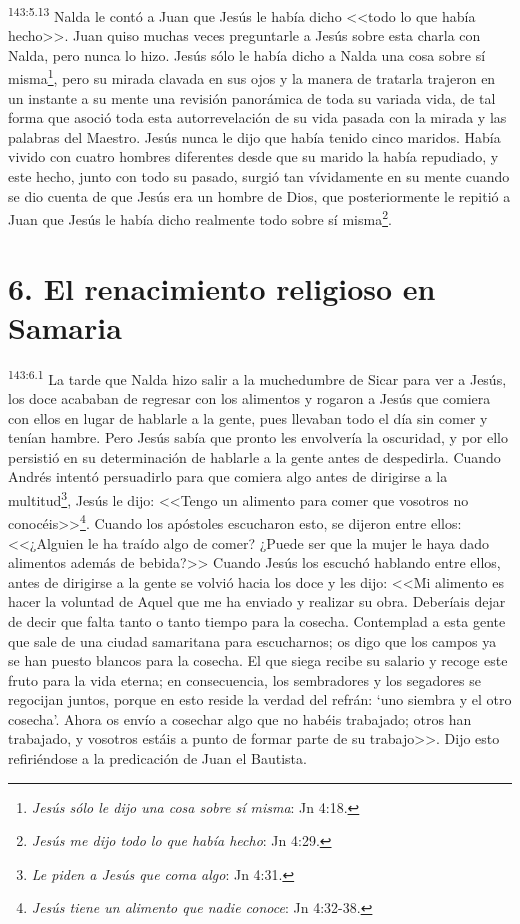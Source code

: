 \par 
\textsuperscript{143:5.13} Nalda le contó a Juan que Jesús le había dicho <<todo lo que había hecho>>. Juan quiso muchas veces preguntarle a Jesús sobre esta charla con Nalda, pero nunca lo hizo. Jesús sólo le había dicho a Nalda una cosa sobre sí misma\footnote{\textit{Jesús sólo le dijo una cosa sobre sí misma}: Jn 4:18.}, pero su mirada clavada en sus ojos y la manera de tratarla trajeron en un instante a su mente una revisión panorámica de toda su variada vida, de tal forma que asoció toda esta autorrevelación de su vida pasada con la mirada y las palabras del Maestro. Jesús nunca le dijo que había tenido cinco maridos. Había vivido con cuatro hombres diferentes desde que su marido la había repudiado, y este hecho, junto con todo su pasado, surgió tan vívidamente en su mente cuando se dio cuenta de que Jesús era un hombre de Dios, que posteriormente le repitió a Juan que Jesús le había dicho realmente todo sobre sí misma\footnote{\textit{Jesús me dijo todo lo que había hecho}: Jn 4:29.}.

\section*{6. El renacimiento religioso en Samaria}
\par 
\textsuperscript{143:6.1} La tarde que Nalda hizo salir a la muchedumbre de Sicar para ver a Jesús, los doce acababan de regresar con los alimentos y rogaron a Jesús que comiera con ellos en lugar de hablarle a la gente, pues llevaban todo el día sin comer y tenían hambre. Pero Jesús sabía que pronto les envolvería la oscuridad, y por ello persistió en su determinación de hablarle a la gente antes de despedirla. Cuando Andrés intentó persuadirlo para que comiera algo antes de dirigirse a la multitud\footnote{\textit{Le piden a Jesús que coma algo}: Jn 4:31.}, Jesús le dijo: <<Tengo un alimento para comer que vosotros no conocéis>>\footnote{\textit{Jesús tiene un alimento que nadie conoce}: Jn 4:32-38.}. Cuando los apóstoles escucharon esto, se dijeron entre ellos: <<¿Alguien le ha traído algo de comer? ¿Puede ser que la mujer le haya dado alimentos además de bebida?>> Cuando Jesús los escuchó hablando entre ellos, antes de dirigirse a la gente se volvió hacia los doce y les dijo: <<Mi alimento es hacer la voluntad de Aquel que me ha enviado y realizar su obra. Deberíais dejar de decir que falta tanto o tanto tiempo para la cosecha. Contemplad a esta gente que sale de una ciudad samaritana para escucharnos; os digo que los campos ya se han puesto blancos para la cosecha. El que siega recibe su salario y recoge este fruto para la vida eterna; en consecuencia, los sembradores y los segadores se regocijan juntos, porque en esto reside la verdad del refrán: `uno siembra y el otro cosecha'. Ahora os envío a cosechar algo que no habéis trabajado; otros han trabajado, y vosotros estáis a punto de formar parte de su trabajo>>. Dijo esto refiriéndose a la predicación de Juan el Bautista.

